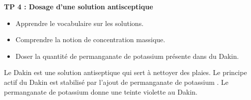 
\renewcommand{\thesubsection}{\textcolor{red}{\Roman{section}.\arabic{subsection}}}
\renewcommand{\thesubsubsection}{\textcolor{red}{\Roman{section}.\arabic{subsection}.\alph{subsubsection}}}

\setcounter{section}{0}
\setcounter{document}{0}
\sndEnTeteTPQuatre

\begin{center}
\begin{mdframed}[style=titr, leftmargin=60pt, rightmargin=60pt, innertopmargin=7pt, innerbottommargin=7pt, innerrightmargin=8pt, innerleftmargin=8pt]

\begin{center}
\large{\textbf{TP 4 : Dosage d'une solution antisceptique}}
\end{center}

\end{mdframed}
\end{center}


\begin{tcolorbox}[colback=blue!5!white,colframe=blue!75!black,title=Objectifs de la séance :]
\begin{itemize}
    \item Apprendre le vocabulaire sur les solutions.
  \item Comprendre la notion de concentration massique.
  \item Doser la quantité de permanganate de potassium présente dans du Dakin.
\end{itemize}
\end{tcolorbox}


\begin{tcolorbox}[colback=orange!5!white,colframe=orange!75!black,title= Scénario:]
Le Dakin est une solution antiseptique qui sert à nettoyer des plaies. Le principe actif du Dakin est stabilisé par l'ajout de permanganate de potassium . Le permanganate de potassium donne une teinte violette au Dakin.
\end{tcolorbox}




